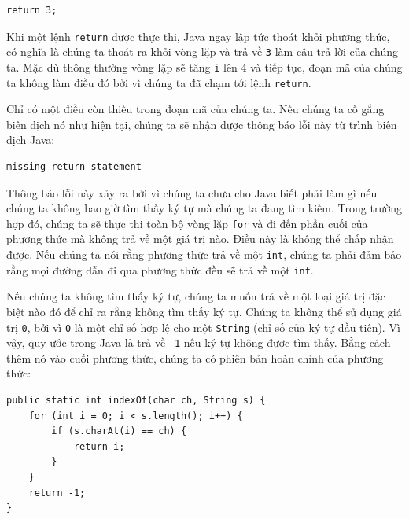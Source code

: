 \begin{verbatim}
return 3;
\end{verbatim}

Khi một lệnh \texttt{return} được thực thi, Java ngay lập tức thoát khỏi
phương thức, có nghĩa là chúng ta thoát ra khỏi vòng lặp và trả về
\texttt{3} làm câu trả lời của chúng ta. Mặc dù thông thường vòng lặp sẽ
tăng \texttt{i} lên 4 và tiếp tục, đoạn mã của chúng ta không làm điều
đó bởi vì chúng ta đã chạm tới lệnh \texttt{return}.

Chỉ có một điều còn thiếu trong đoạn mã của chúng ta. Nếu chúng ta cố
gắng biên dịch nó như hiện tại, chúng ta sẽ nhận được thông báo lỗi này
từ trình biên dịch Java:

\begin{verbatim}
missing return statement
\end{verbatim}

Thông báo lỗi này xảy ra bởi vì chúng ta chưa cho Java biết phải làm gì
nếu chúng ta không bao giờ tìm thấy ký tự mà chúng ta đang tìm kiếm.
Trong trường hợp đó, chúng ta sẽ thực thi toàn bộ vòng lặp \texttt{for}
và đi đến phần cuối của phương thức mà không trả về một giá trị nào.
Điều này là không thể chấp nhận được. Nếu chúng ta nói rằng phương thức
trả về một \texttt{int}, chúng ta phải đảm bảo rằng mọi đường dẫn đi qua
phương thức đều sẽ trả về một \texttt{int}.

Nếu chúng ta không tìm thấy ký tự, chúng ta muốn trả về một loại giá trị
đặc biệt nào đó để chỉ ra rằng không tìm thấy ký tự. Chúng ta không thể
sử dụng giá trị \texttt{0}, bởi vì \texttt{0} là một chỉ số hợp lệ cho
một \texttt{String} (chỉ số của ký tự đầu tiên). Vì vậy, quy ước trong
Java là trả về \texttt{-1} nếu ký tự không được tìm thấy. Bằng cách thêm
nó vào cuối phương thức, chúng ta có phiên bản hoàn chỉnh của phương
thức:

\begin{verbatim}
public static int indexOf(char ch, String s) {
    for (int i = 0; i < s.length(); i++) {
        if (s.charAt(i) == ch) {
            return i;
        }
    }
    return -1;
}
\end{verbatim}
